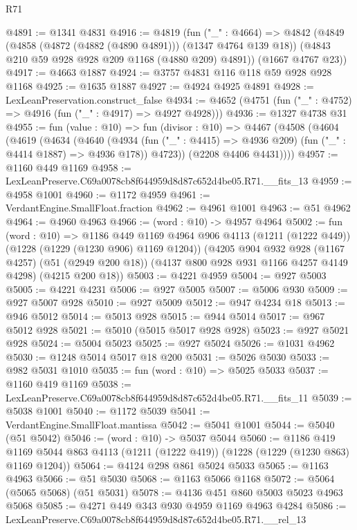 \begin{lexlean}{R71}
\begin{coremodule}
@4891 := @1341 @4831
@4916 := @4819
    (fun ("_" : @4664) =>
    @4842
      (@4849
        (@4858 (@4872 (@4882 (@4890 @4891))) (@1347 @4764 @139 @18))
        (@4843 @210 @59 @928 @928 @209 @1168 (@4880 @209) @4891))
      (@1667 @4767 @23))
@4917 := @4663 @1887
@4924 := @3757 @4831 @116 @118 @59 @928 @928 @1168
@4925 := @1635 @1887
@4927 := @4924 @4925 @4891
@4928 := LexLeanPreservation.construct_false
@4934 := @4652 (@4751 (fun ("_" : @4752) => @4916 (fun ("_" : @4917) => @4927 @4928)))
@4936 := @1327 @4738 @31
@4955 := fun (value : @10) =>
  fun (divisor : @10) =>
  @4467
    (@4508
      (@4604
        (@4619
          (@4634
            (@4640
              (@4934 (fun ("_" : @4415) => @4936 @209) (fun ("_" : @4414 @1887) => @4936 @178))
              @4723))
          (@2208 @4406 @4431))))
@4957 := @1160 @449 @1169
@4958 := LexLeanPreserve.C69a0078cb8f644959d8d87c652d4be05.R71.__fits_13
@4959 := @4958 @1001
@4960 := @1172 @4959
@4961 := VerdantEngine.SmallFloat.fraction
@4962 := @4961 @1001
@4963 := @51 @4962
@4964 := @4960 @4963
@4966 := (word : @10) -> @4957 @4964
@5002 := fun (word : @10) =>
  @1186
    @449
    @1169
    @4964
    @906
    @4113
    (@1211 (@1222 @449))
    (@1228 (@1229 (@1230 @906) @1169 @1204))
    (@4205
      @904
      @932
      @928
      (@1167 @4257)
      (@51 (@2949 @200 @18))
      (@4137 @800 @928 @931 @1166 @4257 @4149 @4298)
      (@4215 @200 @18))
@5003 := @4221 @4959
@5004 := @927 @5003
@5005 := @4221 @4231
@5006 := @927 @5005
@5007 := @5006 @930
@5009 := @927 @5007 @928
@5010 := @927 @5009
@5012 := @947 @4234 @18
@5013 := @946 @5012
@5014 := @5013 @928
@5015 := @944 @5014
@5017 := @967 @5012 @928
@5021 := @5010 (@5015 @5017 @928 @928)
@5023 := @927 @5021 @928
@5024 := @5004 @5023
@5025 := @927 @5024
@5026 := @1031 @4962
@5030 := @1248 @5014 @5017 @18 @200
@5031 := @5026 @5030
@5033 := @982 @5031 @1010
@5035 := fun (word : @10) => @5025 @5033
@5037 := @1160 @419 @1169
@5038 := LexLeanPreserve.C69a0078cb8f644959d8d87c652d4be05.R71.__fits_11
@5039 := @5038 @1001
@5040 := @1172 @5039
@5041 := VerdantEngine.SmallFloat.mantissa
@5042 := @5041 @1001
@5044 := @5040 (@51 @5042)
@5046 := (word : @10) -> @5037 @5044
@5060 := @1186
    @419
    @1169
    @5044
    @863
    @4113
    (@1211 (@1222 @419))
    (@1228 (@1229 (@1230 @863) @1169 @1204))
@5064 := @4124 @298 @861 @5024 @5033
@5065 := @1163 @4963
@5066 := @51 @5030
@5068 := @1163 @5066 @1168
@5072 := @5064 (@5065 @5068) (@51 @5031)
@5078 := @4136 @451 @860 @5003 @5023 @4963 @5068
@5085 := @4271 @449 @343 @930 @4959 @1169 @4963 @4284
@5086 := LexLeanPreserve.C69a0078cb8f644959d8d87c652d4be05.R71.__rel_13

\end{coremodule}
\end{lexlean}
